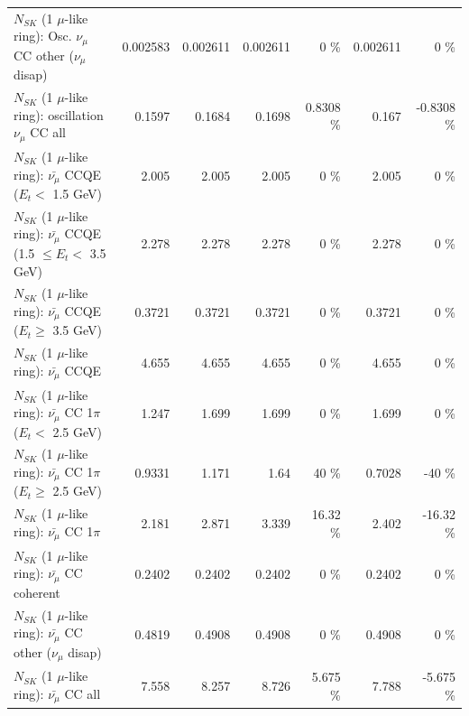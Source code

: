 \begin{table}
\begin{tabular}{| l | r | r | r  r | r  r |}
         $N_{SK}$ (1 $\mu$-like ring): Osc. $\nu_\mu$ CC other ($\nu_\mu$ disap) &        0.002583 &        0.002611 &        0.002611 &        0 \%  &        0.002611 &        0 \%  \\ 
                      $N_{SK}$ (1 $\mu$-like ring): oscillation $\nu_\mu$ CC all &          0.1597 &          0.1684 &          0.1698 &   0.8308 \%  &           0.167 &  -0.8308 \%  \\ 
\hline
\hline
          $N_{SK}$ (1 $\mu$-like ring): $\bar{\nu_\mu}$ CCQE ($E_{t} <$ 1.5 GeV) &           2.005 &           2.005 &           2.005 &        0 \%  &           2.005 &        0 \%  \\ 
 $N_{SK}$ (1 $\mu$-like ring): $\bar{\nu_\mu}$ CCQE (1.5 $\leq E_{t} <$ 3.5 GeV) &           2.278 &           2.278 &           2.278 &        0 \%  &           2.278 &        0 \%  \\ 
       $N_{SK}$ (1 $\mu$-like ring): $\bar{\nu_\mu}$ CCQE ($E_{t} \geq$ 3.5 GeV) &          0.3721 &          0.3721 &          0.3721 &        0 \%  &          0.3721 &        0 \%  \\ 
\hline
                              $N_{SK}$ (1 $\mu$-like ring): $\bar{\nu_\mu}$ CCQE &           4.655 &           4.655 &           4.655 &        0 \%  &           4.655 &        0 \%  \\ 
\hline
     $N_{SK}$ (1 $\mu$-like ring): $\bar{\nu_\mu}$ CC 1$\pi$ ($E_{t} <$ 2.5 GeV) &           1.247 &           1.699 &           1.699 &        0 \%  &           1.699 &        0 \%  \\ 
  $N_{SK}$ (1 $\mu$-like ring): $\bar{\nu_\mu}$ CC 1$\pi$ ($E_{t} \geq$ 2.5 GeV) &          0.9331 &           1.171 &            1.64 &       40 \%  &          0.7028 &      -40 \%  \\ 
\hline
                         $N_{SK}$ (1 $\mu$-like ring): $\bar{\nu_\mu}$ CC 1$\pi$ &           2.181 &           2.871 &           3.339 &    16.32 \%  &           2.402 &   -16.32 \%  \\ 
                       $N_{SK}$ (1 $\mu$-like ring): $\bar{\nu_\mu}$ CC coherent &          0.2402 &          0.2402 &          0.2402 &        0 \%  &          0.2402 &        0 \%  \\ 
        $N_{SK}$ (1 $\mu$-like ring): $\bar{\nu_\mu}$ CC other ($\nu_\mu$ disap) &          0.4819 &          0.4908 &          0.4908 &        0 \%  &          0.4908 &        0 \%  \\ 
                          $N_{SK}$ (1 $\mu$-like ring): $\bar{\nu_{\mu}}$ CC all &           7.558 &           8.257 &           8.726 &    5.675 \%  &           7.788 &   -5.675 \%  \\ 

\end{tabular}
\end{table}
